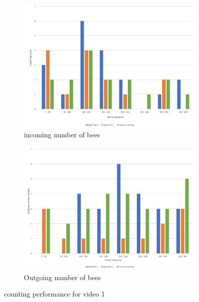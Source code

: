 \documentclass[10pt,twocolumn,letterpaper]{article}
\begin{document}
\clearpage
\begin{figure}[H]
\centering
\begin{subfigure}[b]{0.35\textwidth}
        \includegraphics[width=\textwidth]{graphs/video1_incoming_number_of_bees}
        \caption{incoming number of bees}
        \label{fig:vdo1i}
    \end{subfigure}
    \begin{subfigure}[b]{0.35\textwidth}
        \includegraphics[width=\textwidth]{graphs/video1_outgoing_number_of_bees}
        \caption{Outgoing number of bees}
        \label{fig:vdo1o}
    \end{subfigure}
\caption{counting performance for video 1}
\label{fig:????}
\end{figure}
\end{document}
